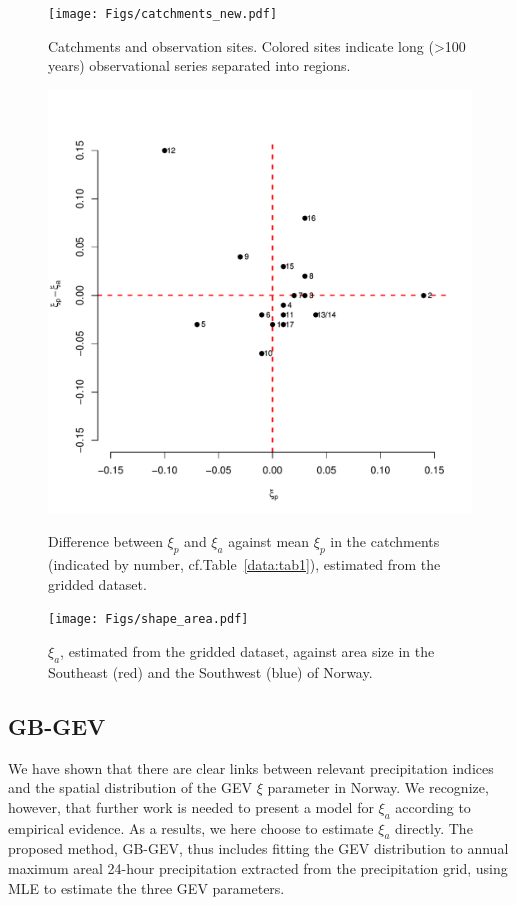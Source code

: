 \documentclass[12pt,a4paper,english]{article}
\begin{document}
\begin{figure}[htbp]
\begin{center}
\texttt{[image: Figs/catchments\_new.pdf]} 
\caption[Map]{\label{data:fig6}Catchments and observation sites. Colored sites indicate long (>100 years) observational series separated into regions.}
\end{center}
\end{figure}

\begin{figure}[!htbp]
\begin{center}
\includegraphics[width = 0.65\linewidth]{Figs/shapeP_shapeA.pdf}
\caption[shape]{\label{data:fig7}Difference between $\xi_{p}$ and $\xi_{a}$ against mean $\xi_{p}$ in the catchments (indicated by number, cf.Table~\ref{data:tab1}), estimated from the gridded dataset.}

\texttt{[image: Figs/shape\_area.pdf]}
\caption[shape]{\label{data:fig8}$\xi_{a}$, estimated from the gridded dataset, against area size in the Southeast (red) and the Southwest (blue) of Norway.}
\end{center}
\end{figure}

\clearpage

\subsection{GB-GEV}

We have shown that there are clear links between relevant precipitation indices and the spatial distribution of the GEV $\xi$ parameter in Norway. We recognize, however, that further work is needed to present a model for $\xi_{a}$ according to empirical evidence. As a results, we here choose to estimate $\xi_{a}$ directly. The proposed method, GB-GEV, thus includes fitting the GEV distribution to annual maximum areal 24-hour precipitation extracted from the precipitation grid, using MLE to estimate the three GEV parameters. 
\end{document}
